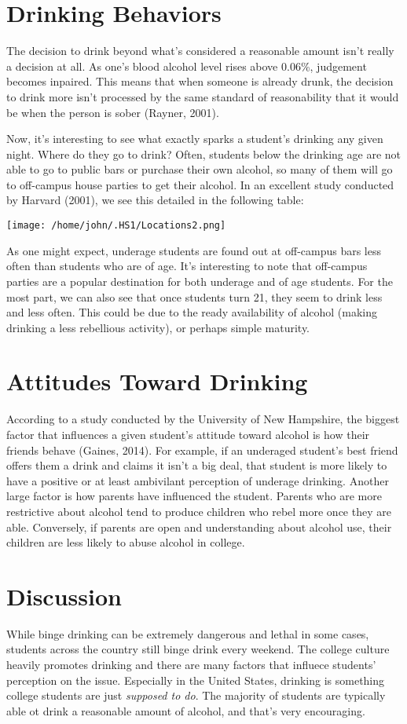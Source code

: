 \documentclass[12pt, man]{apa6}
\begin{document}
\section{Drinking Behaviors}
The decision to drink beyond what's considered a reasonable amount isn't really a decision at all. As one's blood alcohol level rises above 0.06\%, judgement becomes inpaired. This means that when someone is already drunk, the decision to drink more isn't processed by the same standard of reasonability that it would be when the person is sober (Rayner, 2001).

Now, it's interesting to see what exactly sparks a student's drinking any given night. Where do they go to drink? Often, students below the drinking age are not able to go to public bars or purchase their own alcohol, so many of them will go to off-campus house parties to get their alcohol. In an excellent study conducted by Harvard (2001), we see this detailed in the following table:\\
\vspace{5 mm}
\centerline{\texttt{[image: /home/john/.HS1/Locations2.png]}}

As one might expect, underage students are found out at off-campus bars less often than students who are of age. It's interesting to note that off-campus parties are a popular destination for both underage and of age students. For the most part, we can also see that once students turn 21, they seem to drink less and less often. This could be due to the ready availability of alcohol (making drinking a less rebellious activity), or perhaps simple maturity.

\section{Attitudes Toward Drinking}
According to a study conducted by the University of New Hampshire, the biggest factor that influences a given student's attitude toward alcohol is how their friends behave (Gaines, 2014). For example, if an underaged student's best friend offers them a drink and claims it isn't a big deal, that student is more likely to have a positive or at least ambivilant perception of underage drinking. Another large factor is how parents have influenced the student. Parents who are more restrictive about alcohol tend to produce children who rebel more once they are able. Conversely, if parents are open and understanding about alcohol use, their children are less likely to abuse alcohol in college.

\section{Discussion}
While binge drinking can be extremely dangerous and lethal in some cases, students across the country still binge drink every weekend. The college culture heavily promotes drinking and there are many factors that influece students' perception on the issue. Especially in the United States, drinking is something college students are just \textit{supposed to do}. The majority of students are typically able ot drink a reasonable amount of alcohol, and that's very encouraging.



\end{document}
